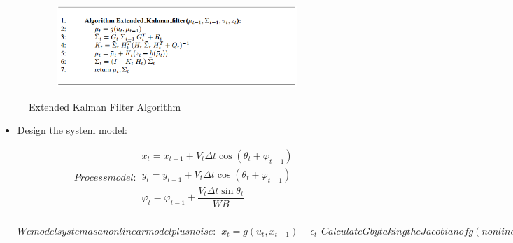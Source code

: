 \documentclass{article}
\begin{document}
\begin{figure}[!h]
    \centering
    \begin{subfigure}[b]{0.6\textwidth}
        \includegraphics[width=\textwidth]{Algorithm-EKF.PNG}
        \label{fig:image-4}
    \end{subfigure}
\caption{Extended Kalman Filter Algorithm}
\end{figure}

\begin{itemize}
	\item{Design the system model:} 
	\begin{itemize}
		\begin{subequations} 
		Process model:
		\begin{align}
			x_t = x_{t-1} + V_t\Delta{t}\cos\left({\theta_t + \varphi_{t-1}}\right) \\
			y_t = y_{t-1} + V_t\Delta{t}\cos\left({\theta_t + \varphi_{t-1}}\right) \\
			\varphi_t = \varphi_{t-1} + \dfrac{V_t\Delta{t}\sin{\theta_t}}{WB}
		\end{align}
		\end{subequations}
		\begin{subequations} 
		We model system as a nonlinear model plus noise:
		\begin{align}
			x_t = g\left({u_t,x_{t-1}}\right)+ \epsilon_t 			
		\end{align}
		Calculate G by taking the Jacobian of g (nonlinear function):
	
		\begin{align*}
		G=
    		\begin{bmatrix}
        	1 & 0 & -R\cos\left({\theta}\right)+ R\cos\left({\theta+ \varphi}\right) \\
        	0 & 1 & -R\sin\left({\theta}\right)+ R\sin\left({\theta+ \varphi}\right) \\
        	0 & 0 & 1
    		\end{bmatrix}
		\end{align*}
		\end{subequations}

		\end{itemize}
\end{itemize}
\end{document}
